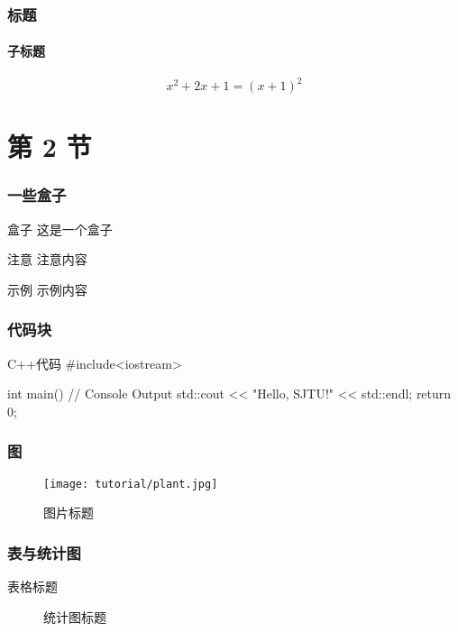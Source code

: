 \documentclass[
    aspectratio=169,		       %
]{ctexbeamer}
\begin{document}
\begin{frame}
  \frametitle{标题}
  \framesubtitle{子标题}

  \begin{equation}
    x^2+2x+1=(x+1)^2
  \end{equation}

\end{frame}

\section{第 2 节}
\begin{frame}
  \frametitle{一些盒子}

  \begin{block}{盒子}
    这是一个盒子\cite{beamerman}
  \end{block}

  \begin{alertblock}{注意}
    注意内容
  \end{alertblock}

  \begin{exampleblock}{示例}
    示例内容
  \end{exampleblock}
\end{frame}

\begin{frame}[fragile]		%
  \frametitle{代码块}
  \begin{codeblock}[language=c++]{C++代码}
#include<iostream>

int main(){
  // Console Output
  std::cout << "Hello, SJTU!" << std::endl;
  return 0;
}
  \end{codeblock}
\end{frame}

\begin{frame}
  \frametitle{图}
  \begin{figure}
    \centering
    \begin{stampbox}
      \texttt{[image: tutorial/plant.jpg]}
    \end{stampbox}
    \caption{图片标题\cite{viman}}
  \end{figure}
\end{frame}

\begin{frame}
  \frametitle{表与统计图}
  \begin{multicols}{2}
    \begin{table}
      \caption{表格标题\cite{pgfplotstableman}}
    \end{table}

    \begin{figure}
      
      \caption{统计图标题\cite{pgfplotsman}}
    \end{figure}
  \end{multicols}
\end{frame}
\end{document}
